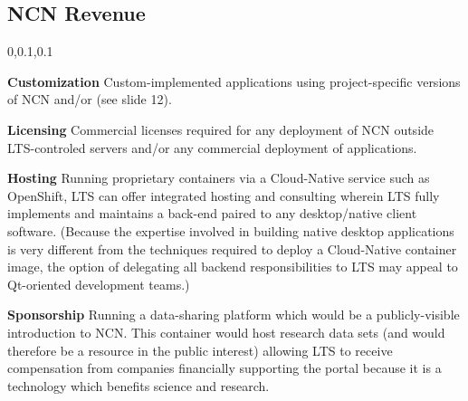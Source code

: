 
\begin{frame}{}
\section{NCN Revenue}
\vspace{-.5em}	

{\selectfont
\hspace*{-20pt}\begin{minipage}{1.1\textwidth}
\vspace{4pt}


		
\begin{lightquadblockc}{0,0.1,0.1}{}
\begin{center}\begin{minipage}{1.05\textwidth}
{\fontsize{16}{23}\selectfont \setlength{\leftmargini}{30pt}\begin{enumerate}
\dmitem \textbf{Customization} \hspace{.5em} Custom-implemented applications 
using project-specific versions of NCN and/or \AtR{} 
(see slide 12).\vspace{10pt}

\dmitem \textbf{Licensing}  \hspace{.5em} Commercial licenses required for 
any deployment of NCN outside LTS-controled 
servers and/or any commercial deployment of \AtR{} 
applications.\vspace{10pt}

\dmitem \textbf{Hosting}  \hspace{.5em} Running proprietary 
containers via a Cloud-Native service such as 
OpenShift, LTS can offer integrated hosting and consulting 
wherein LTS fully implements and maintains a back-end 
paired to any desktop/native client software.
(Because the expertise involved 
in building native desktop applications is very different 
from the techniques required to deploy a Cloud-Native container 
image, the option of delegating all 
backend responsibilities to LTS may 
appeal to Qt-oriented development teams.)\vspace{10pt}

\dmitem \textbf{Sponsorship}  \hspace{.5em} 
Running a data-sharing platform which would be a 
publicly-visible introduction to NCN.  
This  container 
would host research data sets (and 
would therefore be a resource in the public 
interest) allowing LTS to receive compensation 
from companies financially supporting the 
portal because it is a technology which
benefits science and research.
\end{enumerate}
}\end{minipage}
\end{center}
\end{lightquadblockc}
\end{minipage}

}

\end{frame}
